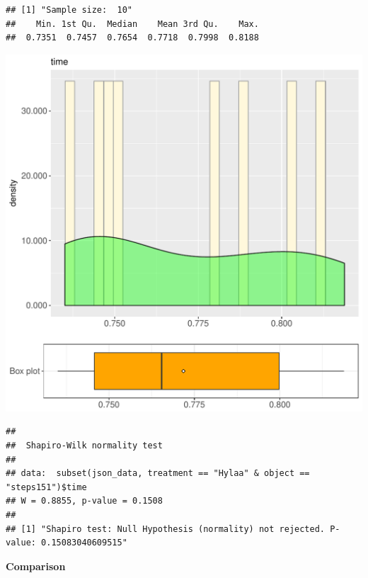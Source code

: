 \documentclass{article}\usepackage[]{graphicx}\usepackage[]{color}
\makeatletter
\def\maxwidth{ %
  \ifdim\Gin@nat@width>\linewidth
    \linewidth
  \else
    \Gin@nat@width
  \fi
}
\newenvironment{kframe}{%
 \def\at@end@of@kframe{}%
 \ifinner\ifhmode%
  \def\at@end@of@kframe{\end{minipage}}%
  \begin{minipage}{\columnwidth}%
 \fi\fi%
 \def\FrameCommand##1{\hskip\@totalleftmargin \hskip-\fboxsep
 \colorbox{shadecolor}{##1}\hskip-\fboxsep
     \hskip-\linewidth \hskip-\@totalleftmargin \hskip\columnwidth}%
 \MakeFramed {\advance\hsize-\width
   \@totalleftmargin\z@ \linewidth\hsize
   \@setminipage}}%
 {\par\unskip\endMakeFramed%
 \at@end@of@kframe}
\newenvironment{knitrout}{}{} %
\makeatother
\begin{document}
\begin{knitrout}
\color{fgcolor}\begin{kframe}
\begin{verbatim}
## [1] "Sample size:  10"
##    Min. 1st Qu.  Median    Mean 3rd Qu.    Max. 
##  0.7351  0.7457  0.7654  0.7718  0.7998  0.8188
\end{verbatim}
\end{kframe}
\includegraphics[width=\maxwidth]{figure/RH2_Hylaa_steps151-1} 
\begin{kframe}\begin{verbatim}
## 
## 	Shapiro-Wilk normality test
## 
## data:  subset(json_data, treatment == "Hylaa" & object == "steps151")$time
## W = 0.8855, p-value = 0.1508
## 
## [1] "Shapiro test: Null Hypothesis (normality) not rejected. P-value: 0.15083040609515"
\end{verbatim}
\end{kframe}
\end{knitrout}
  
 \textbf{Comparison}
  
\end{document}
